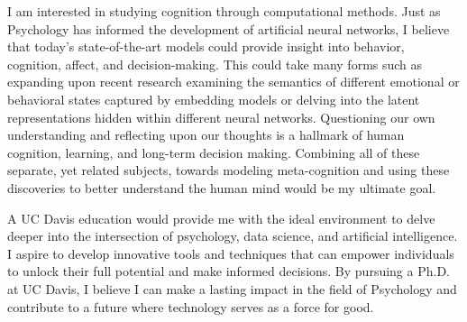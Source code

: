 \documentclass[12pt]{article}
\begin{document}
I am interested in studying cognition through computational methods. Just as Psychology has informed the development of artificial neural
networks, I believe that today's state-of-the-art models could provide insight into behavior, cognition, affect, and decision-making. This
could take many forms such as expanding upon recent research examining the semantics of different emotional or behavioral states captured by
embedding models or delving into the latent representations hidden within different neural networks. Questioning our own understanding and
reflecting upon our thoughts is a hallmark of human cognition, learning, and long-term decision making. Combining all of these separate, yet
related subjects, towards modeling meta-cognition and using these discoveries to better understand the human mind would be my ultimate goal.

A UC Davis education would provide me with the ideal environment to delve deeper into the intersection of psychology, data science, and
artificial intelligence. I aspire to develop innovative tools and techniques that can empower individuals to unlock their full
potential and make informed decisions. By pursuing a Ph.D. at UC Davis, I believe I can make a lasting impact in the field of
Psychology and contribute to a future where technology serves as a force for good.
\end{document}
